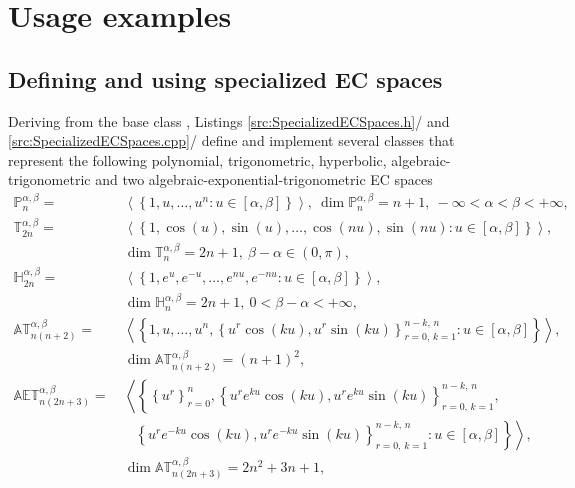 \documentclass[b5paper, twosided]{book}
\newcommand{\CBlue}[1]{{\color[rgb]{0.0, 0.0, 0.9}{#1}}}
\DeclareRobustCommand{\mref}[1]{\ref{#1}{\relsize{-1}/\pageref{#1}}}
\begin{document}
\chapter{Usage examples}\label{ch:Usage_examples}

\section{Defining and using specialized EC spaces}\label{sec:Defining_and_using specialized_EC_spaces}

Deriving from the base class \CBlue{ECSpace}, Listings \mref{src:SpecializedECSpaces.h} and \mref{src:SpecializedECSpaces.cpp} define and implement several classes that represent the following polynomial, trigonometric, hyperbolic, algebraic-trigonometric and two algebraic-exponen\-tial-trigonometric EC spaces
\begin{align}
\mathbb{P}_n^{\alpha,\beta}=&~\left\langle\left\{1,u,\ldots,u^n:u\in\left[\alpha,\beta\right]\right\}\right\rangle,
~\dim \mathbb{P}_n^{\alpha,\beta} = n+1,~-\infty < \alpha < \beta < +\infty,
\label{eq:pure_polynomial}
\\
\mathbb{T}_{2n}^{\alpha,\beta}=&~\left\langle\left\{1,\cos\left(u\right),\sin\left(u\right),\ldots,\cos\left(nu\right),\sin\left(nu\right):u\in\left[\alpha,\beta\right]\right\}\right\rangle,
\label{eq:pure_trigonometric}
\\
&~\dim \mathbb{T}_n^{\alpha,\beta} = 2n+1,
~\beta - \alpha \in \left(0,\pi\right),
\nonumber
\\
\mathbb{H}_{2n}^{\alpha,\beta}=&~\left\langle\left\{1,e^u,e^{-u},\ldots,e^{nu},e^{-nu}:u\in\left[\alpha,\beta\right]\right\}\right\rangle,
\label{eq:pure_hyperbolic}
\\
\nonumber
&~\dim \mathbb{H}_n^{\alpha,\beta} = 2n+1,~0 < \beta-\alpha < +\infty, 
\\
\mathbb{AT}_{n\left(n+2\right)}^{\alpha,\beta} =&~
\left\langle
\left\{
1,u,\ldots,u^n,
\left\{
u^r \cos\left(ku\right),
u^r \sin\left(ku\right)
\right\}_{r=0,\,k=1}^{n-k,\,n}:
u \in \left[\alpha,\beta\right]
\right\}
\right\rangle,
\label{eq:algebraic_trigonometric}
\\
&
~\dim \mathbb{AT}_{n\left(n+2\right)}^{\alpha,\beta} = \left(n+1\right)^2,
\nonumber
\\
\mathbb{AET}_{n\left(2n+3\right)}^{\alpha,\beta}
=&~
\left\langle
\left\{
\left\{u^r\right\}_{r=0}^n,
\left\{
u^r e^{ku}\cos\left(ku\right),
u^r e^{ku}\sin\left(ku\right)
\right\}_{r=0,\,k=1}^{n-k,\,n},
\right.
\right.
\label{eq:algebraic-exponential-trigonometric}
\\
&
~~~~\,
\left.
\left.
\left\{
u^r e^{-ku}\cos\left(ku\right),
u^r e^{-ku}\sin\left(ku\right)
\right\}_{r=0,\,k=1}^{n-k,\,n}:
u \in \left[\alpha,\beta\right]
\right\}
\right\rangle,
\nonumber
\\
&
~\dim \mathbb{AT}_{n\left(2n+3\right)}^{\alpha,\beta} = 2n^2+3n+1,
\nonumber
\end{align}
\end{document}
